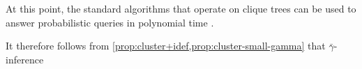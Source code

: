 \documentclass{article}
\newcommand\discard[1]{}
\newcommand\zogamma{{\bar\gamma}}
\begin{document}
At this point, the standard algorithms that operate on
clique trees
can be used to answer probabilistic queries in polynomial time \parencite[\S 10.3.3]{koller2009probabilistic}.
\discard{
    Concretely: marginal probabilities can essentially be read off of a cailbrated a clique tree,
    and evidence $X{=}x$ may be incorporated by
    setting $\mu_C(c) := 0$ for every $C{=}c$ that conflicts with $X{=}x$
    and recalibrating the clique tree (e.g., with belief propogation). }
%
%
%
It therefore
follows from \cref{prop:cluster+idef,prop:cluster-small-gamma}
that
$\zogamma$-inference
\end{document}
